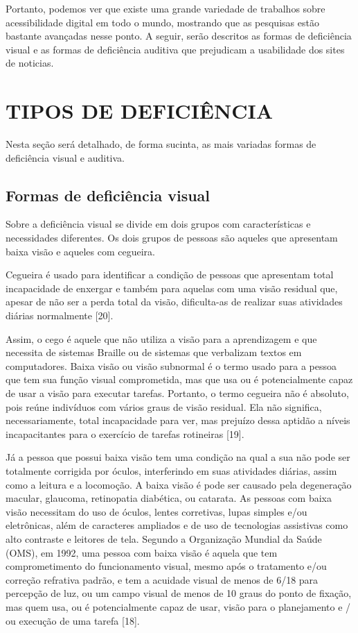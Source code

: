 \documentclass[a4paper]{article}
\begin{document}
\begin{titlepage}
Portanto, podemos ver que existe uma grande variedade de trabalhos sobre acessibilidade digital em todo o mundo, mostrando que as pesquisas estão bastante avançadas nesse ponto. A seguir, serão descritos as formas de deficiência visual e as formas de deficiência auditiva que prejudicam a usabilidade dos sites de noticias.

\section{TIPOS DE DEFICIÊNCIA}
Nesta seção será detalhado, de forma sucinta, as mais variadas formas de deficiência visual e auditiva.

\subsection{Formas de deficiência visual}
Sobre a deficiência visual se divide em dois grupos com características e necessidades diferentes. Os dois grupos de pessoas são aqueles que apresentam baixa visão e aqueles com cegueira.

Cegueira é usado para identificar a condição de pessoas que apresentam total incapacidade de enxergar e também para aquelas com uma visão residual que, apesar de não ser a perda total da visão, dificulta-as de realizar suas atividades diárias normalmente [20].

Assim, o cego é aquele que não utiliza a visão para a aprendizagem e que necessita de sistemas Braille ou de sistemas que verbalizam textos em computadores. Baixa visão ou visão subnormal é o termo usado para a pessoa que tem sua função visual comprometida, mas que usa ou é potencialmente capaz de usar a visão para executar tarefas. Portanto, o termo cegueira não é absoluto, pois reúne indivíduos com vários graus de visão residual. Ela não significa, necessariamente, total incapacidade para ver, mas prejuízo dessa aptidão a níveis incapacitantes para o exercício de tarefas rotineiras [19].

Já a pessoa que possui baixa visão tem uma condição na qual a sua não pode ser totalmente corrigida por óculos, interferindo em suas atividades diárias, assim como a leitura e a locomoção. A baixa visão é pode ser causado pela degeneração macular, glaucoma, retinopatia diabética, ou catarata. As pessoas com baixa visão necessitam do uso de óculos, lentes corretivas, lupas simples e/ou eletrônicas, além de caracteres ampliados e de uso de tecnologias assistivas como alto contraste e leitores de tela. Segundo a Organização Mundial da Saúde (OMS), em 1992, uma pessoa com baixa visão é aquela que tem comprometimento do funcionamento visual, mesmo após o tratamento e/ou correção refrativa padrão, e tem a acuidade visual de menos de 6/18 para percepção de luz, ou um campo visual de menos de 10
graus do ponto de fixação, mas quem usa, ou é potencialmente capaz de usar, visão para o planejamento e / ou execução de uma tarefa [18].


\end{titlepage}
\end{document}
